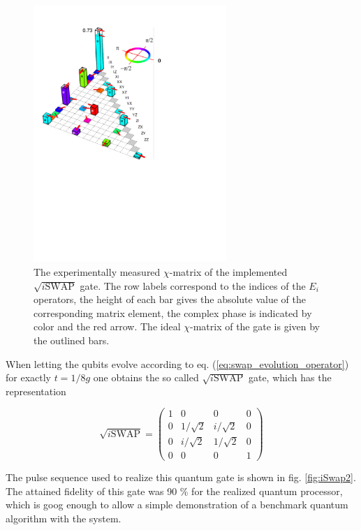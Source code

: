 \begin{figure}
		\includegraphics[width=0.65\textwidth]{./material/papers/iswap/figures/chi_matrix}
	\caption[Experimental $\chi$-matrix of the implemented $\sqrt{i\textrm{SWAP}}$ gate]{The experimentally measured $\chi$-matrix of the implemented $\sqrt{i\mathrm{SWAP}}$ gate. The row labels correspond to the indices of the $E_i$ operators, the height of each bar gives the absolute value of the corresponding matrix element, the complex phase is indicated by color and the red arrow. The ideal $\chi$-matrix of the gate is given by the outlined bars.}
	\label{fig:GateChiMatrixAndErrorProcess}
\end{figure}

When letting the qubits evolve according to eq. (\ref{eq:swap_evolution_operator}) for exactly $t = 1/8g$ one obtains the so called $\sqrt{i\mathrm{SWAP}}$ gate, which has the representation

\begin{equation}
	\sqrt{i\mathrm{SWAP}}  =  \left( \begin{array}{cccc} 1 & 0 & 0 & 0 \\ 0 & 1/\sqrt{2} & i/\sqrt{2} & 0 \\ 0 & i/\sqrt{2} & 1/\sqrt{2} & 0 \\ 0 & 0 & 0 & 1 \end{array} \right) \label{eq:sqrt_iswap_gate}
\end{equation}

The pulse sequence used to realize this quantum gate is shown in fig. \ref{fig:iSwap2}.  The attained fidelity of this gate was 90 \% for the realized quantum processor, which is goog enough to allow a simple demonstration of a benchmark quantum algorithm with the system.


